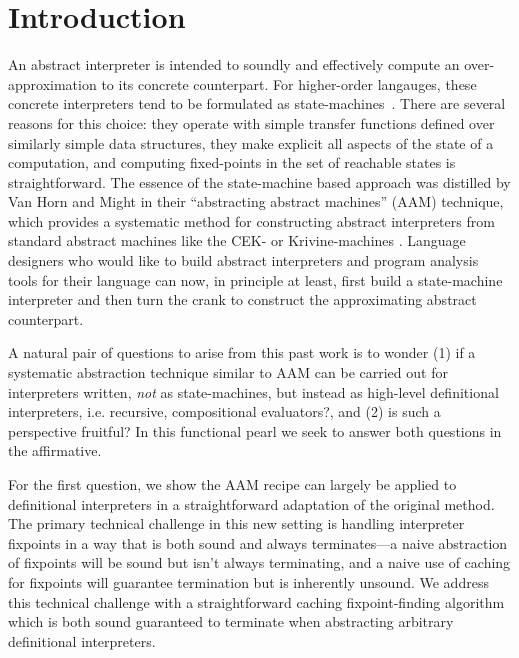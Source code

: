 \section{Introduction}

An abstract interpreter is intended to soundly and effectively compute
an over-approximation to its concrete counterpart.  For higher-order
langauges, these concrete interpreters tend to be formulated as
state-machines~\cite{dvanhorn:jagannathan-weeks-popl95,
  dvanhorn:jagannathan-etal-popl98, 
  dvanhorn:wright-jagannathan-toplas98,
  dvanhorn:Might:2006:DeltaCFA,
  dvanhorn:midtgaard-jensen-sas-08,
  dvanhorn:Midtgaard2009Controlflow,
  dvanhorn:Might2011Family, dvanhorn:Sergey2013Monadic}.  There are
several reasons for this choice: they operate with simple transfer
functions defined over similarly simple data structures, they make
explicit all aspects of the state of a computation, and computing
fixed-points in the set of reachable states is straightforward.
%
The essence of the state-machine based approach was distilled by Van
Horn and Might in their ``abstracting abstract machines'' (AAM)
technique, which provides a systematic method for constructing
abstract interpreters from standard abstract machines like the CEK- or
Krivine-machines \cite{dvanhorn:VanHorn2010Abstracting}.  Language
designers who would like to build abstract interpreters and program
analysis tools for their language can now, in principle at least,
first build a state-machine interpreter and then turn the crank to
construct the approximating abstract counterpart.

A natural pair of questions to arise from this past work is to wonder
(1) if a systematic abstraction technique similar to AAM can be
carried out for interpreters written, \emph{not} as state-machines,
but instead as high-level definitional interpreters, i.e. recursive,
compositional evaluators?, and (2) is such a perspective fruitful?  In
this functional pearl we seek to answer both questions in the
affirmative.

For the first question, we show the AAM recipe can largely be applied
to definitional interpreters in a straightforward adaptation of the
original method. The primary technical challenge in this new setting
is handling interpreter fixpoints in a way that is both sound and
always terminates---a naive abstraction of fixpoints will be sound but
isn't always terminating, and a naive use of caching for fixpoints
will guarantee termination but is inherently unsound. We address this
technical challenge with a straightforward caching fixpoint-finding
algorithm which is both sound guaranteed to terminate when abstracting
arbitrary definitional interpreters.

